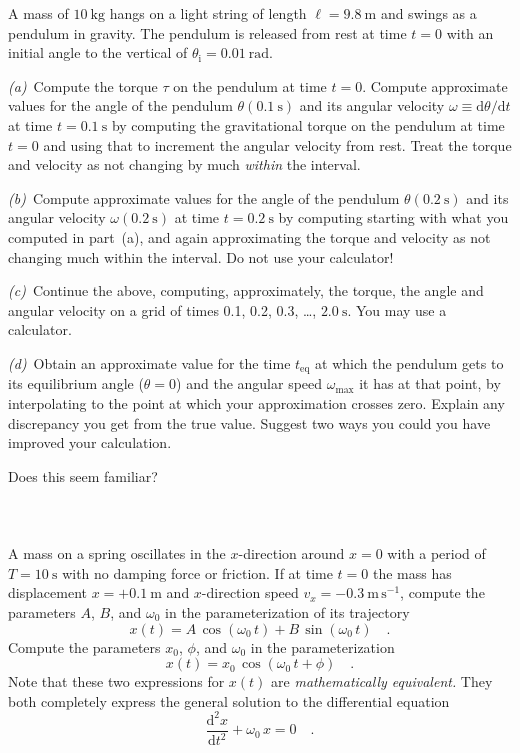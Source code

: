 \documentclass[12pt]{article}
\newcounter{problem}
\begin{document}
A mass of $10~\mathrm{kg}$ hangs on a light string of length $\ell=
9.8~\mathrm{m}$ and swings as a pendulum in gravity.  The pendulum is
released from rest at time $t=0$ with an initial angle to the vertical
of $\theta_\mathrm{i}= 0.01~\mathrm{rad}$.

\textsl{(a)}~Compute the torque $\tau$ on the pendulum at time $t=0$.
Compute approximate values for the angle of the pendulum $\theta
(0.1~\mathrm{s})$ and its angular velocity
$\omega\equiv\mathrm{d}\theta/\mathrm{d}t$ at time $t=0.1~\mathrm{s}$
by computing the gravitational torque on the pendulum at time $t=0$
and using that to increment the angular velocity from rest.  Treat the
torque and velocity as not changing by much \emph{within} the
interval.

\textsl{(b)}~Compute approximate values for the angle of the pendulum
$\theta (0.2~\mathrm{s})$ and its angular velocity $\omega
(0.2~\mathrm{s})$ at time $t=0.2~\mathrm{s}$ by computing starting
with what you computed in part~(a), and again approximating the torque
and velocity as not changing much within the interval.  Do not use
your calculator!

\textsl{(c)}~Continue the above, computing, approximately, the torque,
the angle and angular velocity on a grid of times 0.1, 0.2, 0.3,
\ldots, $2.0~\mathrm{s}$.  You may use a calculator.

\textsl{(d)}~Obtain an approximate value for the time $t_\mathrm{eq}$
at which the pendulum gets to its equilibrium angle ($\theta=0$) and
the angular speed $\omega_\mathrm{max}$ it has at that point, by
interpolating to the point at which your approximation crosses zero.
Explain any discrepancy you get from the true value.  Suggest two ways
you could you have improved your calculation.

Does this seem familiar?

\paragraph{\problemname~\theproblem}

A mass on a spring oscillates in the $x$-direction around $x=0$ with a
period of $T=10~\mathrm{s}$ with no damping force or friction.  If at
time $t=0$ the mass has displacement $x=+0.1~\mathrm{m}$ and
$x$-direction speed $v_x=-0.3~\mathrm{m\,s^{-1}}$, compute the
parameters $A$, $B$, and $\omega_0$ in the parameterization of its
trajectory
\begin{equation}
x(t) = A\,\cos(\omega_0\,t) + B\,\sin(\omega_0\,t) \quad .
\end{equation}
Compute the parameters $x_0$, $\phi$, and $\omega_0$ in the
parameterization
\begin{equation}
x(t) = x_0\,\cos (\omega_0\,t+\phi) \quad .
\end{equation}
Note that these two expressions for $x(t)$ are \emph{mathematically
equivalent.}  They both completely express the general solution to the
differential equation
\begin{equation}
\frac{\mathrm{d}^2x}{\mathrm{d}t^2}+\omega_0\,x=0 \quad .
\end{equation}
\end{document}
